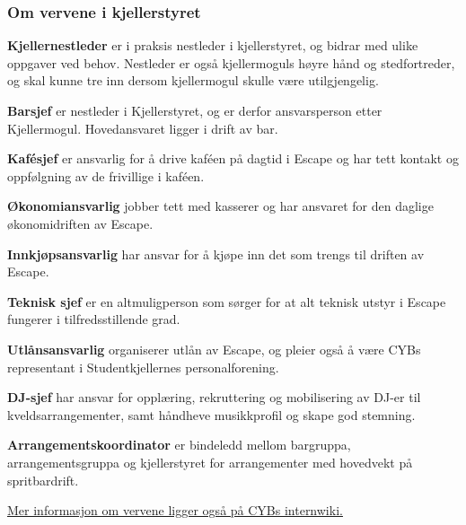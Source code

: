 \documentclass[12pt, norsk, a4paper]{proc}
\begin{document}
\hypertarget{om-vervene-i-kjellerstyret}{%
\subsubsection*{Om vervene i kjellerstyret}\label{om-vervene-i-kjellerstyret}}

\textbf{Kjellernestleder} er i praksis nestleder i kjellerstyret, og bidrar
med ulike oppgaver ved behov. Nestleder er også kjellermoguls høyre
hånd og stedfortreder, og skal kunne tre inn dersom kjellermogul skulle være
utilgjengelig.

\textbf{Barsjef} er nestleder i Kjellerstyret, og er derfor
ansvarsperson etter Kjellermogul. Hovedansvaret ligger i drift av bar.

\textbf{Kafésjef} er ansvarlig for å drive kaféen på dagtid i Escape og
har tett kontakt og oppfølgning av de frivillige i kaféen.

\textbf{Økonomiansvarlig} jobber tett med kasserer og har ansvaret for
den daglige økonomidriften av Escape.

\textbf{Innkjøpsansvarlig} har ansvar for å kjøpe inn det som trengs til
driften av Escape.

\textbf{Teknisk sjef} er en altmuligperson som sørger for at alt
teknisk utstyr i Escape fungerer i tilfredsstillende grad.

\textbf{Utlånsansvarlig} organiserer utlån av Escape, og pleier også å
være CYBs representant i Studentkjellernes personalforening.

\textbf{DJ-sjef} har ansvar for opplæring, rekruttering og mobilisering
av DJ-er til kveldsarrangementer, samt håndheve musikkprofil og skape
god stemning.

\textbf{Arrangementskoordinator} er bindeledd mellom bargruppa,
arrangementsgruppa og kjellerstyret for arrangementer med hovedvekt på
spritbardrift.

\href{https://wiki.cyb.no/display/AKTIV/Vervoversikt}{Mer informasjon om vervene ligger også på CYBs internwiki.}
\end{document}
